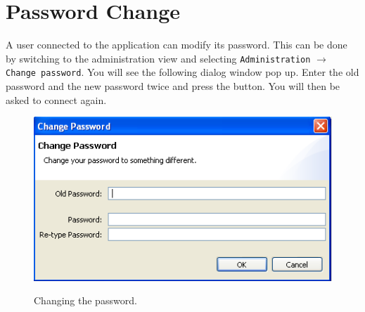 \section{Password Change}
A user connected to the application can modify its password. This can be done by switching to the administration view and selecting \texttt{Administration} $\to$ \texttt{Change password}. You will see the following dialog window pop up. Enter the old password and the new password twice and press the  button. You will then be asked to connect again.
\begin{figure}[H]
  \centering
  \scalebox{0.5}
	   { \includegraphics*{screenshots/administration/change_password} }
	   \caption{Changing the password.}
	   \label{fig:change_password}
\end{figure}

